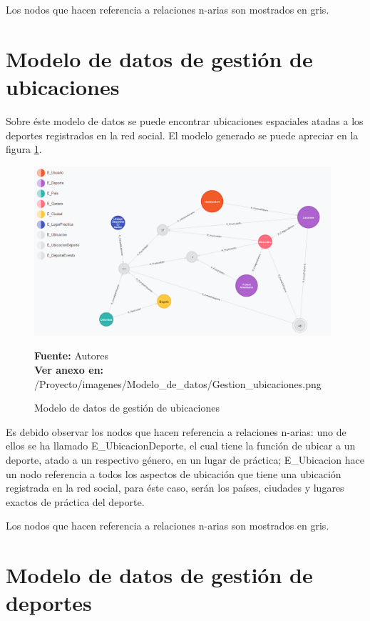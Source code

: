 Los nodos que hacen referencia a relaciones n-arias son mostrados en gris.

\section{Modelo de datos de gestión de ubicaciones}

Sobre éste modelo de datos se puede encontrar ubicaciones espaciales atadas a los deportes registrados en la red social. El modelo generado se puede apreciar en la figura \ref{fig:modelo_datos_gestion_ubicaciones}.

\begin{figure}[!htb]
  \begin{center}
    \includegraphics[width=11cm]{./imagenes/Modelo_de_datos/Gestion_ubicaciones.png}
    \caption{Modelo de datos de gestión de ubicaciones}
    \label{fig:modelo_datos_gestion_ubicaciones}
    \textbf{Fuente:}  Autores \\
    \textbf{Ver anexo en:} /Proyecto/imagenes/Modelo\_de\_datos/Gestion\_ubicaciones.png
  \end{center}
\end{figure}

Es debido observar los nodos que hacen referencia a relaciones n-arias: uno de ellos se ha llamado E\_UbicacionDeporte, el cual tiene la función de ubicar a un deporte, atado a un respectivo género, en un lugar de práctica; E\_Ubicacion hace un nodo referencia a todos los aspectos de ubicación que tiene una ubicación registrada en la red social, para éste caso, serán los países, ciudades y lugares exactos de práctica del deporte.

Los nodos que hacen referencia a relaciones n-arias son mostrados en gris.

\section{Modelo de datos de gestión de deportes}

